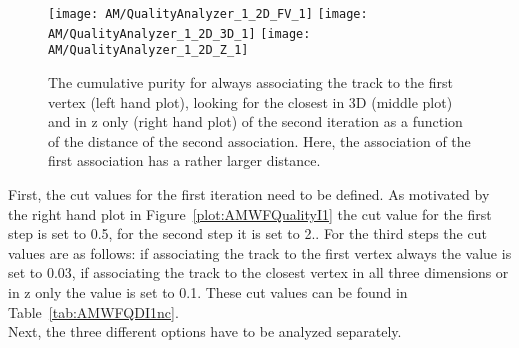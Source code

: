 \begin{figure}[!ht]
  \centering
  \texttt{[image: AM/QualityAnalyzer\_1\_2D\_FV\_1]}
  \texttt{[image: AM/QualityAnalyzer\_1\_2D\_3D\_1]}
  \texttt{[image: AM/QualityAnalyzer\_1\_2D\_Z\_1]}
  \caption[Cumulative purity of iteration two vs relative difference to define quality for larger distances of association one]{The cumulative purity for always associating the track to the first vertex (left hand plot), looking for the closest in 3D (middle plot) and in z only (right hand plot) of the second iteration as a function of the distance of the second association. Here, the association of the first association has a rather larger distance. \label{plot:AMWFQualityI21}}
\end{figure}

First, the cut values for the first iteration need to be defined. As motivated by the right hand plot in Figure~\ref{plot:AMWFQualityI1} the cut value for the first step is set to 0.5\cm, for the second step it is set to 2.\cm. For the third steps the cut values are as follows: if associating the track to the first vertex always the value is set to 0.03\cm, if associating the track to the closest vertex in all three dimensions or in z only the value is set to 0.1\cm. These cut values can be found in Table~\ref{tab:AMWFQDI1nc}.\\
Next, the three different options have to be analyzed separately.



